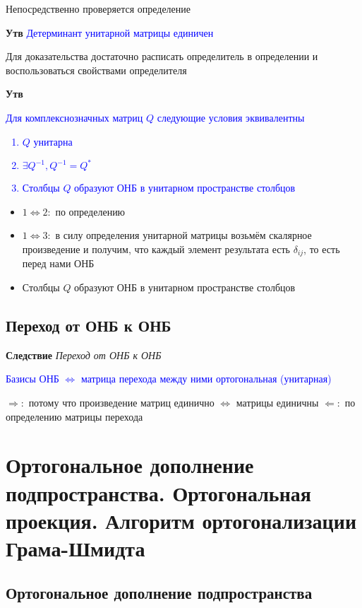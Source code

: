 \documentclass[a4paper, 14pt]{article}
\begin{document}
    Непосредственно проверяется определение
    
    \textbf{Утв} \textcolor{blue}{Детерминант унитарной матрицы единичен}
    
    Для доказательства достаточно расписать определитель в определении и воспользоваться свойствами определителя
    
    \textbf{Утв} \textcolor{blue}{Для комплекснозначных матриц $Q$ следующие условия эквивалентны
        \begin{enumerate}
            \item $Q$ унитарна
            \item $\exists Q^{-1},  Q^{-1} = Q^*$
            \item Столбцы $Q$ образуют ОНБ в унитарном пространстве столбцов
        \end{enumerate}               }
    
    \begin{itemize}
        \item $1 \Leftrightarrow 2:$ по определению
        \item $1 \Leftrightarrow 3:$ в силу определения унитарной матрицы возьмём скалярное произведение и получим,
        что каждый элемент результата есть $\delta_{ij}$, то есть перед нами ОНБ
        \item Столбцы $Q$ образуют ОНБ в унитарном пространстве столбцов
    \end{itemize}
    
    \subsection{Переход от ОНБ к ОНБ}
    
    \textbf{Следствие} \textit{Переход от ОНБ к ОНБ}
    
    \textcolor{blue}{Базисы ОНБ $\Leftrightarrow$ матрица перехода между ними ортогональная (унитарная)}
    
    $\Rightarrow:$ потому что произведение матриц единично $\Leftrightarrow$ матрицы единичны
    $\Leftarrow:$ по определению матрицы перехода
    
    \section{Ортогональное дополнение подпространства.
    Ортогональная проекция.
    Алгоритм ортогонализации Грама-Шмидта}
    
    \subsection{Ортогональное дополнение подпространства}
    
\end{document}
